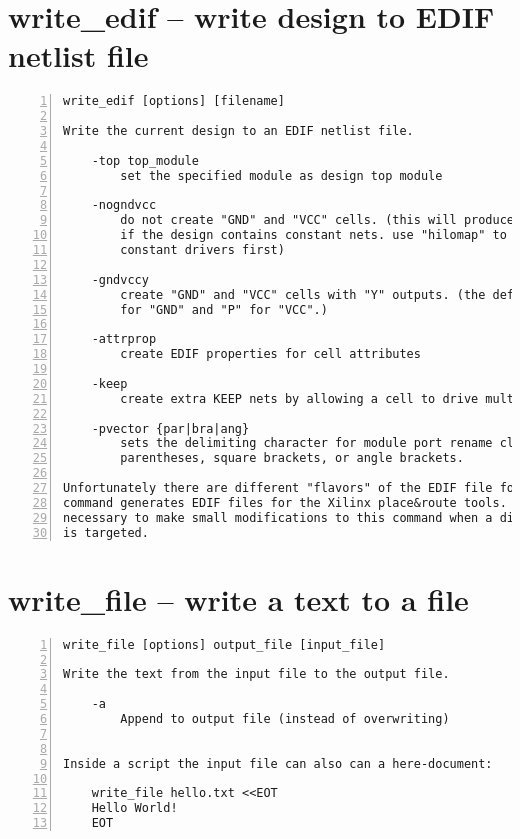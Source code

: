 \section{write\_edif -- write design to EDIF netlist file}
\label{cmd:write_edif}
\begin{lstlisting}[numbers=left,frame=single]
    write_edif [options] [filename]

Write the current design to an EDIF netlist file.

    -top top_module
        set the specified module as design top module

    -nogndvcc
        do not create "GND" and "VCC" cells. (this will produce an error
        if the design contains constant nets. use "hilomap" to map to custom
        constant drivers first)

    -gndvccy
        create "GND" and "VCC" cells with "Y" outputs. (the default is "G"
        for "GND" and "P" for "VCC".)

    -attrprop
        create EDIF properties for cell attributes

    -keep
        create extra KEEP nets by allowing a cell to drive multiple nets.

    -pvector {par|bra|ang}
        sets the delimiting character for module port rename clauses to
        parentheses, square brackets, or angle brackets.

Unfortunately there are different "flavors" of the EDIF file format. This
command generates EDIF files for the Xilinx place&route tools. It might be
necessary to make small modifications to this command when a different tool
is targeted.
\end{lstlisting}

\section{write\_file -- write a text to a file}
\label{cmd:write_file}
\begin{lstlisting}[numbers=left,frame=single]
    write_file [options] output_file [input_file]

Write the text from the input file to the output file.

    -a
        Append to output file (instead of overwriting)


Inside a script the input file can also can a here-document:

    write_file hello.txt <<EOT
    Hello World!
    EOT
\end{lstlisting}

